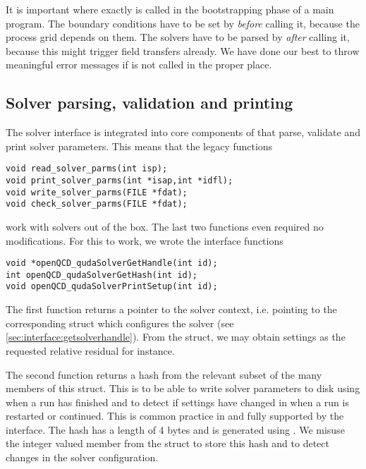 It is important where exactly  is called in the bootstrapping phase of a main program.
The boundary conditions have to be set by  \emph{before} calling it, because the process grid depends on them.
The solvers have to be parsed by  \emph{after} calling it, because this might trigger field transfers already.
We have done our best to throw meaningful error messages if  is not called in the proper place.

\subsection{Solver parsing, validation and printing}
\label{sec:interface:legacy}

The \quda solver interface is integrated into core components of \openqxd that parse, validate and print solver parameters.
This means that the legacy functions
\begin{verbatim}
void read_solver_parms(int isp);
void print_solver_parms(int *isap,int *idfl);
void write_solver_parms(FILE *fdat);
void check_solver_parms(FILE *fdat);
\end{verbatim}
work with \quda solvers out of the box. The last two functions even required no modifications. For this to work, we wrote the interface functions
\begin{verbatim}
void *openQCD_qudaSolverGetHandle(int id);
int openQCD_qudaSolverGetHash(int id);
void openQCD_qudaSolverPrintSetup(int id);
\end{verbatim}

The first function returns a pointer to the solver context, i.e. pointing to the corresponding  struct which configures the solver (see \cref{sec:interface:getsolverhandle}). From the struct, we may obtain settings as the requested relative residual for instance.

The second function returns a hash from the relevant subset of the many members of this struct.
This is to be able to write \quda solver parameters to disk using  when a run has finished and to detect if settings have changed in  when a run is restarted or continued.
This is common practice in \openqxd and fully supported by the interface.
The hash has a length of \num{4} bytes and is generated using .
We misuse the integer valued member  from the  struct to store this hash and to detect changes in the solver configuration.

